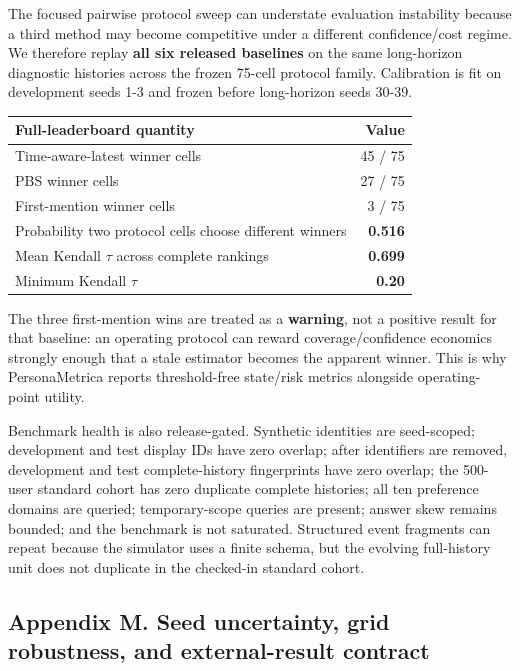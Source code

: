 \documentclass[
  10pt,
  letterpaper,
]{article}
\begin{document}
The focused pairwise protocol sweep can understate evaluation
instability because a third method may become competitive under a
different confidence/cost regime. We therefore replay \textbf{all six
released baselines} on the same long-horizon diagnostic histories across
the frozen 75-cell protocol family. Calibration is fit on development
seeds 1-3 and frozen before long-horizon seeds 30-39.

\begin{longtable}[]{@{}lr@{}}
\toprule\noalign{}
Full-leaderboard quantity & Value \\
\midrule\noalign{}
\endhead
\bottomrule\noalign{}
\endlastfoot
Time-aware-latest winner cells & 45 / 75 \\
PBS winner cells & 27 / 75 \\
First-mention winner cells & 3 / 75 \\
Probability two protocol cells choose different winners &
\textbf{0.516} \\
Mean Kendall \(\tau\) across complete rankings & \textbf{0.699} \\
Minimum Kendall \(\tau\) & \textbf{0.20} \\
\end{longtable}

The three first-mention wins are treated as a \textbf{warning}, not a
positive result for that baseline: an operating protocol can reward
coverage/confidence economics strongly enough that a stale estimator
becomes the apparent winner. This is why PersonaMetrica reports
threshold-free state/risk metrics alongside operating-point utility.

Benchmark health is also release-gated. Synthetic identities are
seed-scoped; development and test display IDs have zero overlap; after
identifiers are removed, development and test complete-history
fingerprints have zero overlap; the 500-user standard cohort has zero
duplicate complete histories; all ten preference domains are queried;
temporary-scope queries are present; answer skew remains bounded; and
the benchmark is not saturated. Structured event fragments can repeat
because the simulator uses a finite schema, but the evolving
full-history unit does not duplicate in the checked-in standard cohort.

\subsection{Appendix M. Seed uncertainty, grid robustness, and
external-result
contract}\label{appendix-m.-seed-uncertainty-grid-robustness-and-external-result-contract}
\end{document}
